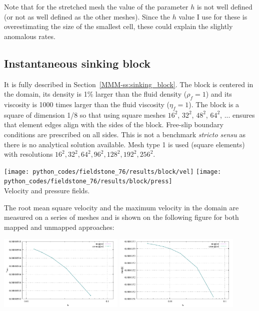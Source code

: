 Note that for the stretched mesh the value of the parameter $h$ is not well defined (or
not as well defined as the other meshes). Since the $h$ value I use for these is overestimating
the size of the smallest cell, these could explain the slightly anomalous rates.

\newpage
\subsection*{Instantaneous sinking block}

It is fully described in Section~\ref{MMM-ss:sinking_block}.
The block is centered in the domain, its density is 1\% larger than the 
fluid density ($\rho_f=1$) and its viscosity is 1000 times larger than 
the fluid viscosity ($\eta_f=1$).
The block is a square of dimension 1/8 so that using square meshes $16^2$, 
$32^2$, $48^2$, $64^2$, ... ensures that element edges align with the 
sides of the block.
Free-slip boundary conditions are prescribed on all sides.
This is not a benchmark {\it stricto sensu} as there is no analytical solution
available. 
Mesh type 1 is used (square elements) with resolutions $16^2, 32^2, 64^2, 96^2, 128^2, 192^2, 256^2$.

\begin{center}
\texttt{[image: python\_codes/fieldstone\_76/results/block/vel]}
\texttt{[image: python\_codes/fieldstone\_76/results/block/press]}\\
{\captionfont Velocity and pressure fields.}
\end{center}

The root mean square velocity and the maximum velocity in the domain are 
measured on a series of meshes 
and is shown on the following figure for both mapped and unmapped approaches: 

\begin{center}
\includegraphics[width=6cm]{python_codes/fieldstone_76/results/block/vrms.pdf}
\includegraphics[width=6cm]{python_codes/fieldstone_76/results/block/maxvel.pdf}
\end{center}

